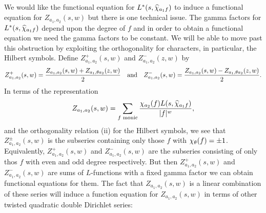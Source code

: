 \documentclass[12pt,reqno,oneside]{amsart}
\begin{document}
    We would like the functional equation for $L^{\ast}(s,\widehat{\chi}_{a_{1}f})$ to induce a functional equation for $Z_{a_{1},a_{2}}(s,w)$ but there is one technical issue. The gamma factors for $L^{\ast}(s,\widehat{\chi}_{a_{1}f})$ depend upon the degree of $f$ and in order to obtain a functional equation we need the gamma factors to be constant. We will be able to move past this obstruction by exploiting the orthogonality for characters, in particular, the Hilbert symbols. Define $Z_{a_{1},a_{2}}^{+}(s,w)$ and $Z_{a_{1},a_{2}}^{-}(z,w)$ by
    \[
        Z_{a_{1},a_{2}}^{+}(s,w) = \frac{Z_{a_{1},a_{2}}(s,w)+Z_{a_{1},\theta a_{2}}(z,w)}{2} \quad \text{and} \quad Z_{a_{1},a_{2}}^{-}(s,w) = \frac{Z_{a_{1},a_{2}}(s,w)-{Z_{a_{1},\theta a_{2}}(z,w)}}{2}.
    \]
    In terms of the representation
    \[
        Z_{a_{1},a_{2}}(s,w) = \sum_{\text{$f$ monic}}\frac{\chi_{a_{2}}(f)L(s,\widehat{\chi}_{a_{1}f})}{|f|^{w}},
    \]
    and the orthogonality relation (ii) for the Hilbert symbols, we see that $Z_{a_{1},a_{2}}^{\pm}(s,w)$ is the subseries containing only those $f$ with $\chi_{\theta}(f) = \pm 1$. Equivalently, $Z_{a_{1},a_{2}}^{+}(s,w)$ and $Z_{a_{1},a_{2}}^{-}(s,w)$ are the subseries consisting of only thos $f$ with even and odd degree respectively. But then $Z_{a_{1},a_{2}}^{+}(s,w)$ and $Z_{a_{1},a_{2}}^{-}(s,w)$ are sums of $L$-functions with a fixed gamma factor we can obtain functional equations for them. The fact that $Z_{a_{1},a_{2}}(s,w)$ is a linear combination of these series will induce a function equation for $Z_{a_{1},a_{2}}(s,w)$ in terms of other twisted quadratic double Dirichlet series:
\end{document}
